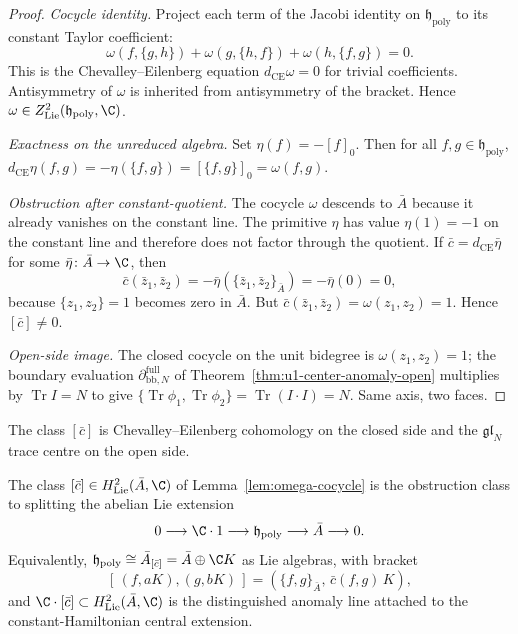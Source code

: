 \documentclass[11pt]{memoir}
\begin{document}
\begin{proof}
  \emph{Cocycle identity.}  Project each term of the Jacobi identity
  on \(\mathfrak h_{\mathrm{poly}}\) to its constant Taylor coefficient:
  $$\omega(f,\{g,h\})+\omega(g,\{h,f\})+\omega(h,\{f,g\})=0.$$
  This is the Chevalley--Eilenberg equation
  \(d_{\mathrm{CE}}\omega=0\) for trivial coefficients.  Antisymmetry
  of \(\omega\) is inherited from antisymmetry of the
  bracket.  Hence
  $\omega\in Z^2_{\mathrm{Lie}}(\mathfrak h_{\mathrm{poly}},\C)$.

  \emph{Exactness on the unreduced algebra.}  Set $\eta(f)=-[f]_0$.
  Then for all $f,g\in\mathfrak h_{\mathrm{poly}}$,
  \(d_{\mathrm{CE}}\eta(f,g)=-\eta(\{f,g\})
  =[\{f,g\}]_0=\omega(f,g)\).

  \emph{Obstruction after constant-quotient.}  The cocycle $\omega$
  descends to \(\bar A\) because it already vanishes on the constant
  line.  The primitive $\eta$ has value \(\eta(1)=-1\) on the constant
  line and therefore does not factor through the quotient.  If
  \(\bar c=d_{\mathrm{CE}}\bar\eta\) for some
  \(\bar\eta\colon\bar A\to\C\), then
  \[
    \bar c(\bar z_1,\bar z_2)
    =-\bar\eta(\{\bar z_1,\bar z_2\}_{\bar A})
    =-\bar\eta(0)=0,
  \]
  because \(\{z_1,z_2\}=1\) becomes zero in
  \(\bar A\).  But \(\bar c(\bar z_1,\bar z_2)=\omega(z_1,z_2)=1\).
  Hence \([\bar c]\neq0\).

  \emph{Open-side image.}  The closed cocycle on the unit bidegree is
  $\omega(z_1,z_2)=1$; the boundary evaluation
  $\partial_{\mathrm{bb},N}^{\mathrm{full}}$ of
  Theorem~\ref{thm:u1-center-anomaly-open} multiplies by
  $\operatorname{Tr}I=N$ to give
  $\{\operatorname{Tr}\phi_1,\operatorname{Tr}\phi_2\}
  =\operatorname{Tr}(I\cdot I)=N$.  Same axis, two faces.
\end{proof}

The class \([\bar c]\) is Chevalley--Eilenberg cohomology on the
closed side and the \(\mathfrak{gl}_N\) trace centre on the open
side.

\begin{thm}\label{thm:u1-center-anomaly}
  The class $[\bar c]\in H^2_{\mathrm{Lie}}(\bar A,\C)$ of
  Lemma~\ref{lem:omega-cocycle} is the obstruction class to splitting
  the abelian Lie extension
  $$0\longrightarrow \C\cdot 1\longrightarrow \mathfrak h_{\mathrm{poly}}
    \longrightarrow \bar A\longrightarrow 0.$$
  Equivalently, $\mathfrak h_{\mathrm{poly}}\cong\bar A_{[\bar c]}
  =\bar A\oplus\C K$ as Lie algebras, with bracket
  $$[\,(f,aK),(g,bK)\,]=(\{f,g\}_{\bar A},\,\bar c(f,g)\,K),$$
  and $\C\cdot[\bar c]\subset H^2_{\mathrm{Lie}}(\bar A,\C)$ is the
  distinguished anomaly line attached to the constant-Hamiltonian
  central extension.
\end{thm}
\end{document}
